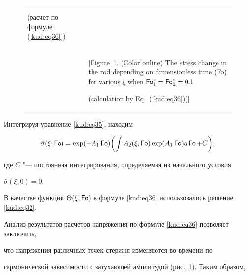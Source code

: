 \begin{figure}[b!]
\begin{tabular}{p{7.7cm}p{4.8cm}}
{(расчет по формуле (\ref{kud:eq36}))

\label{kud:pic13}}

\\

&\vspace{-3.4cm}

[Figure~\ref{kud:pic13}. (Color online) The stress change in the rod depending on  dimensionless time ({\sf Fo}) for various $\xi$ when $\operatorname{\sf Fo}_ 1^c =\operatorname{\sf Fo}_2^c =0.1$ 

\centerline{(calculation by  Eq.~(\ref{kud:eq36}))]}

\\





\end{tabular}



\vspace{-5mm}



\end{figure}





Интегрируя уравнение \eqref{kud:eq35}, находим

\begin{equation}

\label{kud:eq36}

 {\bar \sigma}( \xi,\operatorname{\sf Fo})=

 \exp (-A_1 \operatorname{\sf Fo}) 

 \biggl( \int A_2 (\xi, \operatorname{\sf Fo})\exp (A_1 \operatorname{\sf Fo})d\operatorname{\sf Fo}+ C \biggr) ,

\end{equation}

где $C$ "--- постоянная интегрирования, определяемая из начального условия

$\bar \sigma(\xi, 0)= 0$.

В качестве функции $ \Theta( \xi,\operatorname{\sf Fo})$ в формуле \eqref{kud:eq36} использовалось решение \eqref{kud:eq32}.



Анализ результатов расчетов напряжения по формуле \eqref{kud:eq36} позволяет заключить,

что напряжения различных точек стержня изменяются во времени по

гармонической зависимости с затухающей амплитудой (рис.~\ref{kud:pic13}). Таким образом,

